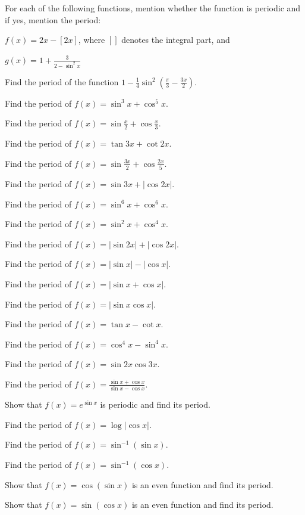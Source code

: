 \item For each of the following functions, mention whether the function is periodic and if yes, mention the
   period:
\startitemize[a]
\item $f(x) = 2x - [2x]$, where $[ ]$ denotes the integral part, and
\item $g(x) = 1 + \frac{3}{2 - \sin^2x}$
\stopitemize
\item Find the period of the function $1 - \frac{1}{4}\sin^2\left(\frac{\pi}{3} - \frac{3x}{2}\right)$.
\item Find the period of $f(x) = \sin^3x + \cos^5x$.
\item Find the period of $f(x) = \sin\frac{x}{2} + \cos\frac{x}{3}$.
\item Find the period of $f(x) = \tan3x + \cot2x$.
\item Find the period of $f(x) = \sin\frac{3x}{2} + \cos\frac{2x}{5}$.
\item Find the period of $f(x) = \sin3x + |\cos2x|$.
\item Find the period of $f(x) = \sin^6x + \cos^6x$.
\item Find the period of $f(x) = \sin^2x + \cos^4x$.
\item Find the period of $f(x) = |\sin2x| + |\cos2x|$.
\item Find the period of $f(x) = |\sin x| - |\cos x|$.
\item Find the period of $f(x) = |\sin x + \cos x|$.
\item Find the period of $f(x) = |\sin x\cos x|$.
\item Find the period of $f(x) = \tan x - \cot x$.
\item Find the period of $f(x) = \cos^4x - \sin^4x$.
\item Find the period of $f(x) = \sin2x\cos3x$.
\item Find the period of $f(x) = \frac{\sin x + \cos x}{\sin x - \cos x}$.
\item Show that $f(x) = e^{\sin x}$ is periodic and find its period.
\item Find the period of $f(x) = \log|\cos x|$.
\item Find the period of $f(x) = \sin^{-1}(\sin x)$.
\item Find the period of $f(x) = \sin^{-1}(\cos x)$.
\item Show that $f(x) = \cos(\sin x)$ is an even function and find its period.
\item Show that $f(x) = \sin(\cos x)$ is an even function and find its period.
